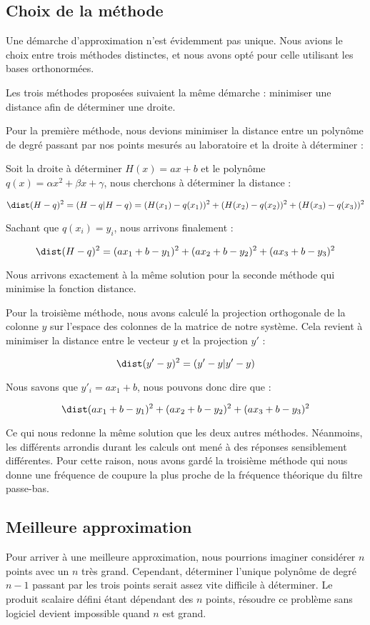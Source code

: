 \subsection{Choix de la méthode}

Une démarche d'approximation n'est évidemment pas unique. Nous avions le choix entre trois méthodes
distinctes, et nous avons opté pour celle utilisant les bases orthonormées.

Les trois méthodes proposées suivaient la même démarche : minimiser une distance afin de déterminer une droite. 

Pour la première méthode, nous devions minimiser la distance entre un polynôme de degré  passant par nos
points mesurés au laboratoire et la droite à déterminer :

Soit la droite à déterminer $H(x) = ax + b$ et le polynôme $q(x) = \alpha x^2 + \beta x + \gamma$, nous
cherchons à déterminer la distance :

$$\dist({H-q})^2 = (H-q|H-q) = (H(x_1)-q(x_1))^2 + (H(x_2)-q(x_2))^2 + (H(x_3)-q(x_3))^2$$

Sachant que $q(x_i) = y_i$, nous arrivons finalement :

$$\dist({H-q})^2 = (ax_1 + b - y_1)^2 + (ax_2 + b - y_2)^2 + (ax_3 + b - y_3)^2$$

Nous arrivons exactement à la même solution pour la seconde méthode qui minimise la fonction distance. 

Pour la troisième méthode, nous avons calculé la projection orthogonale de la colonne $y$ sur l'espace
des colonnes de la matrice de notre système. Cela revient à minimiser la distance entre le vecteur $y$ 
et la projection $y'$ :

$$\dist({y'-y})^2 = (y'-y|y'-y)$$

Nous savons que $y'_i = ax_1 + b$, nous pouvons donc dire que :

$$\dist({ax_1 + b - y_1})^2 + (ax_2 + b - y_2)^2 + (ax_3 + b - y_3)^2$$

Ce qui nous redonne la même solution que les deux autres méthodes. 
Néanmoins, les différents arrondis durant les calculs ont mené à des réponses sensiblement différentes. 
Pour cette raison, nous avons gardé la troisième méthode qui nous donne une fréquence de coupure la plus
proche de la fréquence théorique du filtre passe-bas.
 
\subsection{Meilleure approximation}
Pour arriver à une meilleure approximation, nous pourrions imaginer considérer $n$ points avec un
$n$ très grand. Cependant, déterminer l'unique polynôme de degré $n-1$ passant par les trois points 
serait assez vite difficile à déterminer. Le produit scalaire défini étant dépendant 
des $n$ points, résoudre ce problème sans logiciel devient impossible quand $n$ est grand.  

